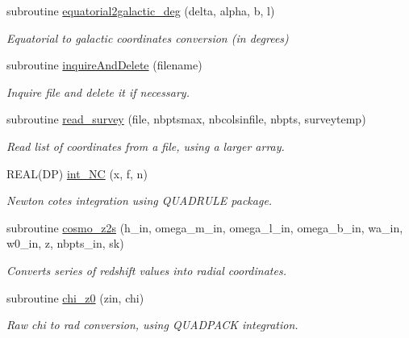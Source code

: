 \begin{DoxyCompactItemize}
\item 
subroutine \hyperlink{namespacef3dex__cosmotools_abeb005e8bef92ebc0927b69db637906d}{equatorial2galactic\_\-deg} (delta, alpha, b, l)
\begin{DoxyCompactList}\small\item\em Equatorial to galactic coordinates conversion (in degrees) \end{DoxyCompactList}\item 
subroutine \hyperlink{namespacef3dex__cosmotools_a0caf479bc891741c90e36f878444e333}{inquireAndDelete} (filename)
\begin{DoxyCompactList}\small\item\em Inquire file and delete it if necessary. \end{DoxyCompactList}\item 
subroutine \hyperlink{namespacef3dex__cosmotools_a36578d36cffe32d26a9fd914d032ef3a}{read\_\-survey} (file, nbptsmax, nbcolsinfile, nbpts, surveytemp)
\begin{DoxyCompactList}\small\item\em Read list of coordinates from a file, using a larger array. \end{DoxyCompactList}\item 
REAL(DP) \hyperlink{namespacef3dex__cosmotools_a25e2703c39b2d99c864537823f2f8402}{int\_\-NC} (x, f, n)
\begin{DoxyCompactList}\small\item\em Newton cotes integration using QUADRULE package. \end{DoxyCompactList}\item 
subroutine \hyperlink{namespacef3dex__cosmotools_a78ae43d2bd5f180e65c710dc694bcee4}{cosmo\_\-z2s} (h\_\-in, omega\_\-m\_\-in, omega\_\-l\_\-in, omega\_\-b\_\-in, wa\_\-in, w0\_\-in, z, nbpts\_\-in, sk)
\begin{DoxyCompactList}\small\item\em Converts series of redshift values into radial coordinates. \end{DoxyCompactList}\item 
subroutine \hyperlink{namespacef3dex__cosmotools_abdbb37c7c522bf29ebf089412b9d7854}{chi\_\-z0} (zin, chi)
\begin{DoxyCompactList}\small\item\em Raw chi to rad conversion, using QUADPACK integration. \end{DoxyCompactList}\item 

\end{DoxyCompactItemize}

